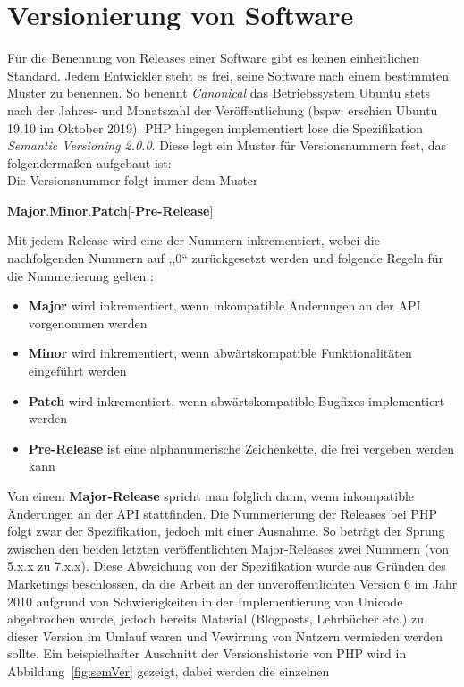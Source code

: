 \section{Versionierung von Software}
Für die Benennung von Releases einer Software gibt es keinen einheitlichen Standard. Jedem Entwickler steht es frei, seine
Software nach einem bestimmten Muster zu benennen. So benennt \textit{Canonical} das Betriebssystem Ubuntu stets nach der 
Jahres- und Monatszahl der Veröffentlichung (bspw. erschien Ubuntu 19.10 im Oktober 2019). \ac{PHP} hingegen implementiert
lose die Spezifikation \textit{Semantic Versioning 2.0.0}. Diese legt ein Muster für Versionsnummern fest, das 
folgendermaßen aufgebaut ist: \\
Die Versionsnummer folgt immer dem Muster \\ \centerline{\textbf{Major}.\textbf{Minor}.\textbf{Patch}{[-\textbf{Pre-Release}]}}
Mit jedem Release wird eine der Nummern inkrementiert, wobei die nachfolgenden Nummern auf ,,0`` zurückgesetzt werden 
und folgende Regeln für die Nummerierung gelten \cite{preston-werner_semantic_nodate}:
\begin{itemize}
    \item \textbf{Major} wird inkrementiert, wenn inkompatible Änderungen an der API vorgenommen werden
    \item \textbf{Minor} wird inkrementiert, wenn abwärtskompatible Funktionalitäten eingeführt werden
    \item \textbf{Patch} wird inkrementiert, wenn abwärtskompatible Bugfixes implementiert werden
    \item \textbf{Pre-Release} ist eine alphanumerische Zeichenkette, die frei vergeben werden kann
\end{itemize}
Von einem \textbf{Major-Release} spricht man folglich dann, wenn inkompatible Änderungen an der API stattfinden. 
Die Nummerierung der Releases bei \ac{PHP} folgt zwar der Spezifikation, jedoch mit einer Ausnahme. So beträgt der 
Sprung zwischen den beiden letzten veröffentlichten Major-Releases zwei Nummern (von 5.x.x zu 7.x.x). Diese Abweichung 
von der Spezifikation wurde aus Gründen des Marketings beschlossen, da die Arbeit an der unveröffentlichten Version 6 
im Jahr 2010 aufgrund von Schwierigkeiten in der Implementierung von Unicode abgebrochen wurde, jedoch bereits Material 
(Blogposts, Lehrbücher etc.) zu dieser Version im Umlauf waren und Vewirrung von Nutzern vermieden werden sollte.
Ein beispielhafter Auschnitt der Versionshistorie von \ac{PHP} wird in Abbildung~\ref{fig:semVer} gezeigt, dabei werden die einzelnen
